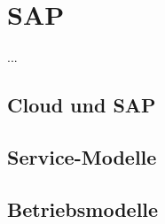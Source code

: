 \section{SAP}
\label{sec_sap}

...

\subsection{Cloud und SAP}
\label{sec_sap_general}



\subsection{Service-Modelle}
\label{sec_sap_delivery}



\subsection{Betriebsmodelle}
\label{sec_sap_deployment}

